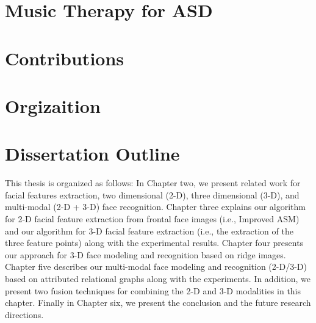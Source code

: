 \section{Music Therapy for ASD}

\section{Contributions}


\section{Orgizaition}


\section{Dissertation Outline}
This thesis is organized as follows: In Chapter two, we present
related work for facial features extraction, two dimensional (2-D),
three dimensional (3-D), and multi-modal (2-D + 3-D) face
recognition. Chapter three explains our algorithm for 2-D facial
feature extraction from frontal face images (i.e., Improved ASM) and
our algorithm for 3-D facial feature extraction (i.e., the
extraction of the three feature points) along with the experimental
results. Chapter four presents our approach for 3-D face modeling
and recognition based on ridge images. Chapter five describes our
multi-modal face modeling and recognition (2-D/3-D) based on
attributed relational graphs along with the experiments. In
addition, we present two fusion techniques for combining the 2-D and
3-D modalities in this chapter. Finally in Chapter six, we present
the conclusion and the future research directions.
